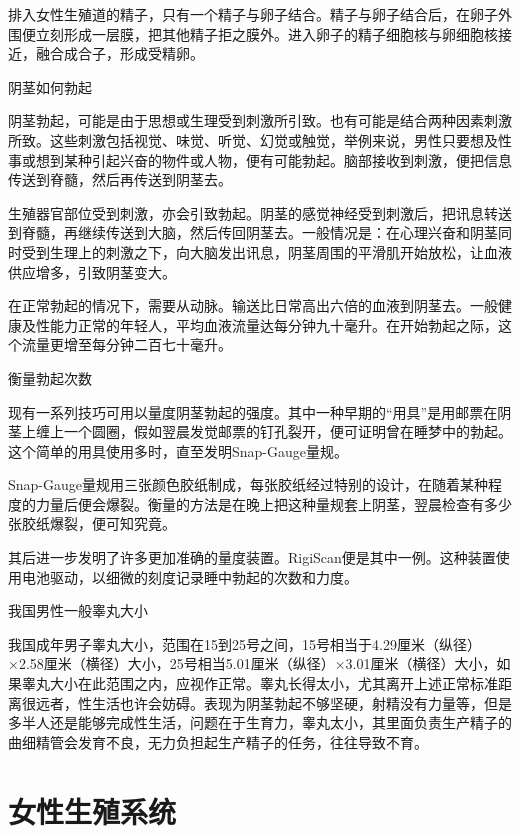 \documentclass[12pt,UTF8]{ctexbook}
\begin{document}
排入女性生殖道的精子，只有一个精子与卵子结合。精子与卵子结合后，在卵子外围便立刻形成一层膜，把其他精子拒之膜外。进入卵子的精子细胞核与卵细胞核接近，融合成合子，形成受精卵。





阴茎如何勃起


阴茎勃起，可能是由于思想或生理受到刺激所引致。也有可能是结合两种因素刺激所致。这些刺激包括视觉、味觉、听觉、幻觉或触觉，举例来说，男性只要想及性事或想到某种引起兴奋的物件或人物，便有可能勃起。脑部接收到刺激，便把信息传送到脊髓，然后再传送到阴茎去。

生殖器官部位受到刺激，亦会引致勃起。阴茎的感觉神经受到刺激后，把讯息转送到脊髓，再继续传送到大脑，然后传回阴茎去。一般情况是：在心理兴奋和阴茎同时受到生理上的刺激之下，向大脑发出讯息，阴茎周围的平滑肌开始放松，让血液供应增多，引致阴茎变大。

在正常勃起的情况下，需要从动脉。输送比日常高出六倍的血液到阴茎去。一般健康及性能力正常的年轻人，平均血液流量达每分钟九十毫升。在开始勃起之际，这个流量更增至每分钟二百七十毫升。





衡量勃起次数


现有一系列技巧可用以量度阴茎勃起的强度。其中一种早期的“用具”是用邮票在阴茎上缠上一个圆圈，假如翌晨发觉邮票的钉孔裂开，便可证明曾在睡梦中的勃起。这个简单的用具使用多时，直至发明Snap-Gauge量规。

Snap-Gauge量规用三张颜色胶纸制成，每张胶纸经过特别的设计，在随着某种程度的力量后便会爆裂。衡量的方法是在晚上把这种量规套上阴茎，翌晨检查有多少张胶纸爆裂，便可知究竟。

其后进一步发明了许多更加准确的量度装置。RigiScan便是其中一例。这种装置使用电池驱动，以细微的刻度记录睡中勃起的次数和力度。





我国男性一般睾丸大小


我国成年男子睾丸大小，范围在15到25号之间，15号相当于4.29厘米（纵径）×2.58厘米（横径）大小，25号相当5.01厘米（纵径）×3.01厘米（横径）大小，如果睾丸大小在此范围之内，应视作正常。睾丸长得太小，尤其离开上述正常标准距离很远者，性生活也许会妨碍。表现为阴茎勃起不够坚硬，射精没有力量等，但是多半人还是能够完成性生活，问题在于生育力，睾丸太小，其里面负责生产精子的曲细精管会发育不良，无力负担起生产精子的任务，往往导致不育。





\chapter{女性生殖系统}
\end{document}
